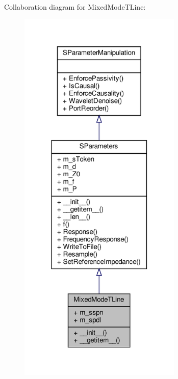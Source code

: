 Collaboration diagram for Mixed\+Mode\+T\+Line\+:
\nopagebreak
\begin{figure}[H]
\begin{center}
\leavevmode
\includegraphics[width=220pt]{classSignalIntegrity_1_1SParameters_1_1Devices_1_1MixedModeTline_1_1MixedModeTLine__coll__graph}
\end{center}
\end{figure}
